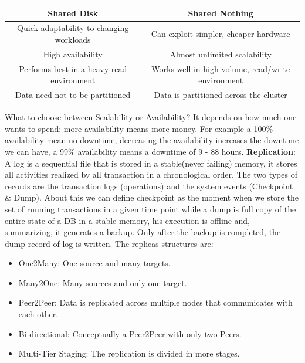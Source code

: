 \documentclass[a4page, 11pt]{article}
\begin{document}
\begin{center}
	\begin{tabular}{|c|c|}
		\hline
		\textbf{Shared Disk} & \textbf{Shared Nothing}\\
		\hline
		Quick adaptability to changing workloads & Can exploit simpler, cheaper hardware\\
		\hline
		High availability & Almost unlimited scalability\\
		\hline
		Performs best in a heavy read environment & Works well in high-volume, read/write environment\\
		\hline
		Data need not to be partitioned & Data is partitioned across the cluster\\
		\hline
	\end{tabular}
\end{center}
What to choose between Scalability or Availability? It depends on how much one wants to spend: more availability means more money. For example a 100\% availability mean no downtime, decreasing the availability increases the downtime we can have, a 99\% availability means a downtime of 9 - 88 hours.
\newline
\textbf{Replication}:
\newline
A log is a sequential file that is stored in a stable(never failing) memory, it stores all activities realized by all transaction in a chronological order. The two types of records are the transaction logs (operations) and the system events (Checkpoint \& Dump). About this we can define checkpoint as the moment when we store the set of running transactions in a given time point while a dump is full copy of the entire state of a DB in a stable memory, his execution is offline and, summarizing, it generates a backup. Only after the backup is completed, the dump record of log is written.
\newline
The replicas structures are:
\begin{itemize}[noitemsep]
	\item One2Many: One source and many targets.
	\item Many2One: Many sources and only one target.
	\item Peer2Peer: Data is replicated across multiple nodes that communicates with each other.
	\item Bi-directional: Conceptually a Peer2Peer with only two Peers.
	\item Multi-Tier Staging: The replication is divided in more stages.
\end{itemize}
\end{document}
